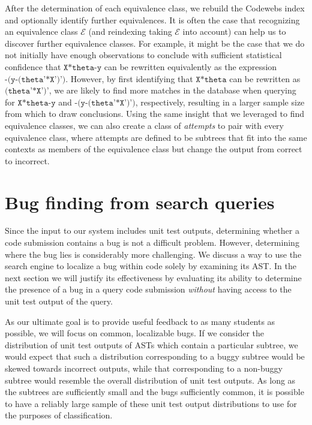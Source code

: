  After the determination of each equivalence class, we rebuild the Codewebs index and optionally
identify further equivalences.  It is often the case that recognizing an equivalence class  $\mathcal{E}$ (and reindexing 
taking $\mathcal{E}$ into account) can help us to discover further equivalence classes.
For example, it might be the case that we do not 
initially have enough observations to conclude with sufficient statistical confidence that 
$\texttt{X*theta-y}$ can be rewritten equivalently as the expression $\texttt{-(y-(theta'*X')')}$.
However, by first identifying that $\texttt{X*theta}$ can be rewritten as $\texttt{(theta'*X')'}$, 
we are likely to find more matches in the database when querying for $\texttt{X*theta-y}$ and $\texttt{-(y-(theta'*X')')}$, respectively,
resulting in a larger sample size from which to draw conclusions.
Using the same insight that we leveraged to find equivalence classes, we can also create a class of \emph{attempts} 
to pair with every equivalence class, where attempts are defined to be
subtrees that fit into the same contexts as members of the equivalence class but change the output from correct to incorrect.

\section{Bug finding from search queries}
Since the input to our system includes unit test outputs, determining whether a code submission contains a bug is not a difficult problem.  However, determining where the bug lies is considerably more challenging.  We discuss a way to use the search engine to localize a bug within code solely by examining its AST.  In the next section we will justify its effectiveness by evaluating its ability to determine the presence of a bug in a query code submission \emph{without} having access to the unit test output of the query.

As our ultimate goal is to provide useful feedback to as many students as possible, we will focus on common, localizable bugs.  If we consider the distribution of unit test outputs of ASTs which contain a particular subtree, we would expect that such a distribution corresponding to a buggy subtree would be skewed towards incorrect outputs, while that corresponding to a non-buggy subtree would resemble the overall distribution of unit test outputs.  
As long as the subtrees are sufficiently small and the bugs sufficiently common, it is possible to have a reliably large sample of these unit test
output distributions to use for the purposes of classification.

